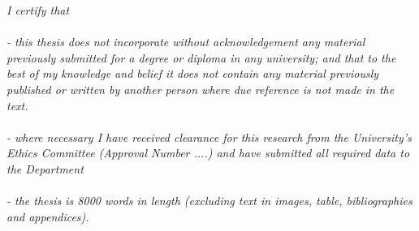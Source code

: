
\begin{declaration}
\textit{
I certify that\\ \\
- this thesis does not incorporate without acknowledgement any material previously submitted for a degree or
diploma in any university; and that to the best of my knowledge and belief it does not contain any material
previously published or written by another person where due reference is not made in the text.\\ \\
- where necessary I have received clearance for this research from the University's Ethics Committee
(Approval Number ....) and have submitted all required data to the Department\\ \\
- the thesis is 8000 words in length (excluding text in images, table, bibliographies and appendices).\\ \\}


\end{declaration}

